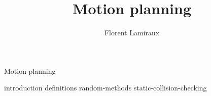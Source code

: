 \documentclass[xcolor = {svgnames,x11names}]{beamer}
\title {Motion planning}
\subtitle{}
\author[]
{Florent Lamiraux}
\institute[CNRS-LAAS] %
{
  CNRS-LAAS, Toulouse, France
}
\date[] %
{}
\begin{document}
\lstset{
breakatwhitespace=true,
breaklines=true
tabsize=3, 
}

\begin{frame}
  \titlepage
\end{frame}

%
\begin{frame}{Motion planning}
\end{frame}

 {introduction}
 {definitions}
 {random-methods}
 {static-collision-checking}
\end{document}
